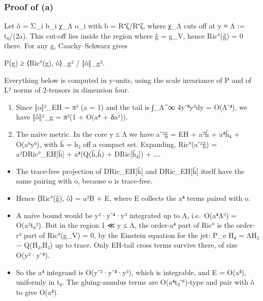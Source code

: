 \documentclass[
  10pt,
]{report}
\providecommand{\tightlist}{%
  \setlength{\itemsep}{0pt}\setlength{\parskip}{0pt}}
\begin{document}
\hypertarget{proof-of-a}{%
\subsubsection{Proof of (a)}\label{proof-of-a}}

Let ô = Σ\_i b\_i χ\_Λ o\_i with b = R⁺ζ/\textbar R⁺ζ\textbar, where
χ\_Λ cuts off at \textbar y\textbar{} ≈ Λ := t₀/(2a). This cut-off lies
inside the region where g̃ = g\_V, hence Ric°(g̃) = 0 there. For any g,
Cauchy--Schwarz gives

P(g) ≥ ⟨Ric°(g), ô⟩\_g² / ‖ô‖\_g².

Everything below is computed in y-units, using the scale invariance of P
and of L² norms of 2-tensors in dimension four.

\begin{enumerate}
\def\labelenumi{(\roman{enumi})}
\item
  Since ‖o‖²\_EH = π² (a = 1) and the tail is ∫\_Λ\^{}∞ 4y⁻⁸y³dy =
  O(Λ⁻⁴), we have ‖ô‖²\_g = π²(1 + O(a⁴ + δa²)).
\item
  The naïve metric. In the core \textbar y\textbar{} ≤ Λ we have a⁻²g̃ =
  EH + a²ĥ + a⁴ĥ₄ + O(a⁶\textbar y\textbar⁶), with ĥ = h₂ off a compact
  set. Expanding, Ric°(a⁻²g̃) = a²DRic°\_EH{[}ĥ{]} + a⁴(Q(ĥ,ĥ) +
  DRic{[}ĥ₄{]}) + \ldots.
\end{enumerate}

\begin{itemize}
\tightlist
\item
  The trace-free projection of DRic\_EH{[}ĥ{]} and DRic\_EH{[}ĥ{]}
  itself have the same pairing with o, because o is trace-free.
\item
  Hence ⟨Ric°(g̃), ô⟩ = a²\textbar B\textbar{} + E, where E collects the
  a⁴ terms paired with o.
\item
  A naive bound would be
  \textbar y\textbar²·\textbar y\textbar⁻⁴·\textbar y\textbar³
  integrated up to Λ, i.e.~O(a⁴Λ²) = O(a²t₀²). But in the region 1 ≪
  \textbar y\textbar{} ≤ Λ, the order-a⁴ part of Ric° is the order-r²
  part of Ric°(g\_V) = 0, by the Einstein equation for the jet: P\_e H₄
  = ΛH₂ − Q(H₂,H₂) up to trace. Only EH-tail cross terms survive there,
  of size O(\textbar y\textbar²·\textbar y\textbar⁻⁴).
\item
  So the a⁴ integrand is
  O(\textbar y\textbar⁻²·\textbar y\textbar⁻⁴·\textbar y\textbar³),
  which is integrable, and E = O(a⁴), uniformly in t₀. The
  gluing-annulus terms are O(a⁴t₀⁻⁶)-type and pair with ô to give O(a⁴).
\end{itemize}
\end{document}
